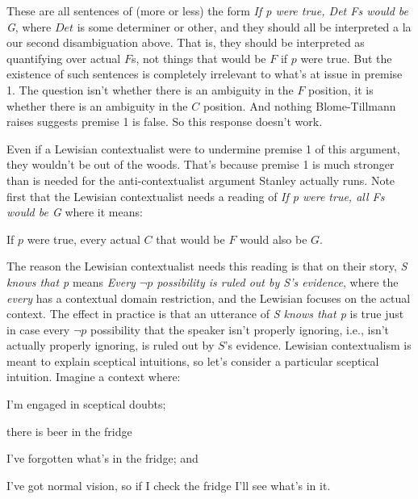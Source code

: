 
\noindent These are all sentences of (more or less) the form \textit{If p were true, Det Fs would be G}, where \(Det\) is some determiner or other, and they should all be interpreted a la our second disambiguation above. That is, they should be interpreted as quantifying over actual \(F\)s, not things that would be \(F\) if \(p\) were true. But the existence of such sentences is completely irrelevant to what's at issue in premise 1. The question isn't whether there is an ambiguity in the \(F\) position, it is whether there is an ambiguity in the \(C\) position. And nothing Blome-Tillmann raises suggests premise 1 is false. So this response doesn't work.

Even if a Lewisian contextualist were to undermine premise 1 of this argument, they wouldn't be out of the woods. That's because premise 1 is much stronger than is needed for the anti-contextualist argument Stanley actually runs. Note first that the Lewisian contextualist needs a reading of \textit{If p were true, all Fs would be G} where it means:

\begin{itemize*}
\item If \(p\) were true, every actual \(C\) that would be \(F\) would also be \(G\).
\end{itemize*}

\noindent The reason the Lewisian contextualist needs this reading is that on their story, \textit{S knows that p} means \textit{Every $\neg p$ possibility is ruled out by S's evidence}, where the \textit{every} has a contextual domain restriction, and the Lewisian focuses on the actual context. The effect in practice is that an utterance of \textit{S knows that p} is true just in case every $\neg p$ possibility that the speaker isn't properly ignoring, i.e., isn't actually properly ignoring, is ruled out by \(S\)'s evidence. Lewisian contextualism is meant to explain sceptical intuitions, so let's consider a particular sceptical intuition. Imagine a context where:

\begin{itemize*}
\item I'm engaged in sceptical doubts;
\item there is beer in the fridge
\item I've forgotten what's in the fridge; and
\item I've got normal vision, so if I check the fridge I'll see what's in it.
\end{itemize*}


